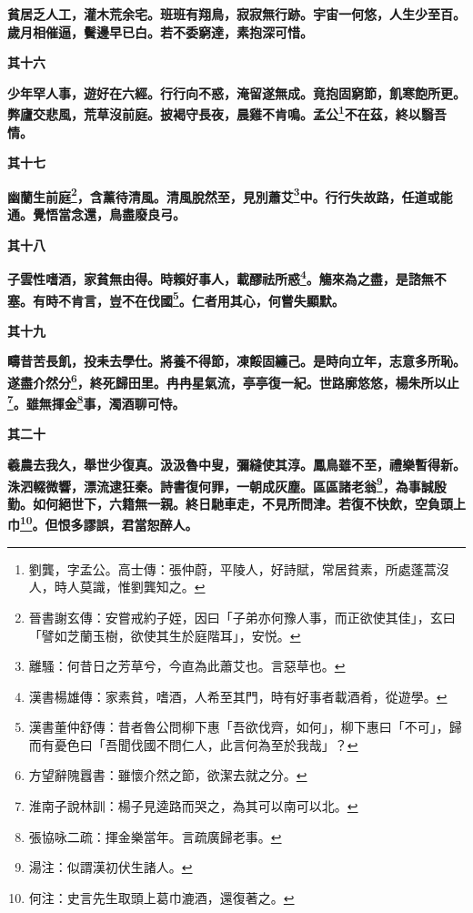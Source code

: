 \textbf{貧居乏人工，灌木荒余宅。班班有翔鳥，寂寂無行跡。宇宙一何悠，人生少至百。歲月相催逼，鬢邊早已白。若不委窮達，素抱深可惜。}

\begin{quoting}\textbf{其十六}\end{quoting}

\textbf{少年罕人事，遊好在六經。行行向不惑，淹留遂無成。竟抱固窮節，飢寒飽所更。弊廬交悲風，荒草沒前庭。披褐守長夜，晨雞不肯鳴。孟公\footnote{劉龔，字孟公。高士傳：張仲蔚，平陵人，好詩賦，常居貧素，所處蓬蒿沒人，時人莫識，惟劉龔知之。}不在茲，終以翳吾情。}

\begin{quoting}\textbf{其十七}\end{quoting}

\textbf{幽蘭生前庭\footnote{晉書謝玄傳：安嘗戒約子姪，因曰「子弟亦何豫人事，而正欲使其佳」，玄曰「譬如芝蘭玉樹，欲使其生於庭階耳」，安悦。}，含薰待清風。清風脫然至，見別蕭艾\footnote{離騷：何昔日之芳草兮，今直為此蕭艾也。言惡草也。}中。行行失故路，任道或能通。覺悟當念還，鳥盡廢良弓。}

\begin{quoting}\textbf{其十八}\end{quoting}

\textbf{子雲性嗜酒，家貧無由得。時賴好事人，載醪祛所惑\footnote{漢書楊雄傳：家素貧，嗜酒，人希至其門，時有好事者載酒肴，從遊學。}。觴來為之盡，是諮無不塞。有時不肯言，豈不在伐國\footnote{漢書董仲舒傳：昔者魯公問柳下惠「吾欲伐齊，如何」，柳下惠曰「不可」，歸而有憂色曰「吾聞伐國不問仁人，此言何為至於我哉」？}。仁者用其心，何嘗失顯默。}

\begin{quoting}\textbf{其十九}\end{quoting}

\textbf{疇昔苦長飢，投耒去學仕。將養不得節，凍餒固纏己。是時向立年，志意多所恥。遂盡介然分\footnote{方望辭隗囂書：雖懷介然之節，欲潔去就之分。}，終死歸田里。冉冉星氣流，亭亭復一紀。世路廓悠悠，楊朱所以止\footnote{淮南子說林訓：楊子見逵路而哭之，為其可以南可以北。}。雖無揮金\footnote{張協咏二疏：揮金樂當年。言疏廣歸老事。}事，濁酒聊可恃。}

\begin{quoting}\textbf{其二十}\end{quoting}

\textbf{羲農去我久，舉世少復真。汲汲魯中叟，彌縫使其淳。鳳鳥雖不至，禮樂暫得新。洙泗輟微響，漂流逮狂秦。詩書復何罪，一朝成灰塵。區區諸老翁\footnote{湯注：似謂漢初伏生諸人。}，為事誠殷勤。如何絕世下，六籍無一親。終日馳車走，不見所問津。若復不快飲，空負頭上巾\footnote{何注：史言先生取頭上葛巾漉酒，還復著之。}。但恨多謬誤，君當恕醉人。}

